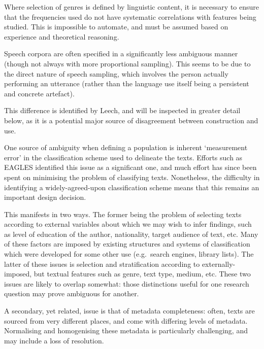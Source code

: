 Where selection of genres is defined by linguistic content, it is necessary to ensure that the frequencies used do not have systematic correlations with features being studied.  This is impossible to automate, and must be assumed based on experience and theoretical reasoning.


Speech corpora are often specified in a significantly less ambiguous manner (though not always with more proportional sampling). This seems to be due to the direct nature of speech sampling, which involves the person actually performing an utterance (rather than the language use itself being a persistent and concrete artefact).

This difference is identified by Leech\cite{leech2006new}, and will be inspected in greater detail below, as it is a potential major source of disagreement between construction and use. %



One source of ambiguity when defining a population is inherent `measurement error' in the classification scheme used to delineate the texts.
Efforts such as EAGLES\cite{EagTcwgCtypeaglespreliminary} identified this issue as a significant one, and much effort has since been spent on minimising the problem of classifying texts.  Nonetheless, the difficulty in identifying a widely-agreed-upon classification scheme means that this remains an important design decision.

This manifests in two ways. The former being the problem of selecting texts according to external variables about which we may wish to infer findings, such as level of education of the author, nationality, target audience of text, etc.  Many of these factors are imposed by existing structures and systems of classification which were developed for some other use (e.g.\ search engines, library lists).  The latter of these issues is selection and stratification according to externally-imposed, but textual features such as genre, text type, medium, etc.  These two issues are likely to overlap somewhat: those distinctions useful for one research question may prove ambiguous for another.

A secondary, yet related, issue is that of metadata completeness: often, texts are sourced from very different places, and come with differing levels of metadata.  Normalising and homogenising these metadata is particularly challenging, and may include a loss of resolution.

